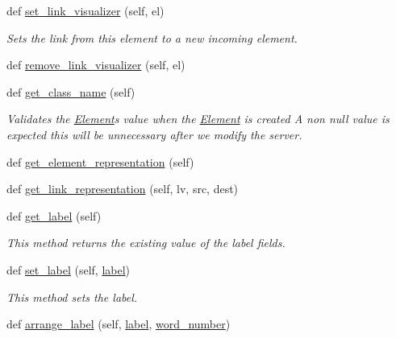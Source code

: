 \begin{DoxyCompactItemize}
def \hyperlink{classbridges_1_1element_1_1_element_afe94604116e0dec9a60a4ea54a462323}{set\+\_\+link\+\_\+visualizer} (self, el)
\begin{DoxyCompactList}\small\item\em Sets the link from this element to a new incoming element. \end{DoxyCompactList}\item 
def \hyperlink{classbridges_1_1element_1_1_element_ad2aff75ace2a306deff639b4aa129ce0}{remove\+\_\+link\+\_\+visualizer} (self, el)
\item 
def \hyperlink{classbridges_1_1element_1_1_element_ae5f31192ad8bf482ab591dbe688ff0ab}{get\+\_\+class\+\_\+name} (self)
\begin{DoxyCompactList}\small\item\em Validates the \hyperlink{classbridges_1_1element_1_1_element}{Element}\textquotesingle{}s value when the \hyperlink{classbridges_1_1element_1_1_element}{Element} is created A non null value is expected this will be unnecessary after we modify the server. \end{DoxyCompactList}\item 
def \hyperlink{classbridges_1_1element_1_1_element_a511fbc6323616d806ae0ae33010f4654}{get\+\_\+element\+\_\+representation} (self)
\item 
def \hyperlink{classbridges_1_1element_1_1_element_a8f220d7b81c0e0dd84b9eff33ade76b9}{get\+\_\+link\+\_\+representation} (self, lv, src, dest)
\item 
def \hyperlink{classbridges_1_1element_1_1_element_ac16d00f128d828ca5c7cd29ddaa24508}{get\+\_\+label} (self)
\begin{DoxyCompactList}\small\item\em This method returns the existing value of the label fields. \end{DoxyCompactList}\item 
def \hyperlink{classbridges_1_1element_1_1_element_a24ac44d81788e7f4a87a262031e4976b}{set\+\_\+label} (self, \hyperlink{classbridges_1_1element_1_1_element_ae12ef70d1eca4cead476bc117db31d43}{label})
\begin{DoxyCompactList}\small\item\em This method sets the label. \end{DoxyCompactList}\item 
def \hyperlink{classbridges_1_1element_1_1_element_ad1bf2f767776d8dbc8afc92a35396254}{arrange\+\_\+label} (self, \hyperlink{classbridges_1_1element_1_1_element_ae12ef70d1eca4cead476bc117db31d43}{label}, \hyperlink{classbridges_1_1element_1_1_element_acd203dd3944abb6407aa37957b5f07ce}{word\+\_\+number})

\end{DoxyCompactItemize}
